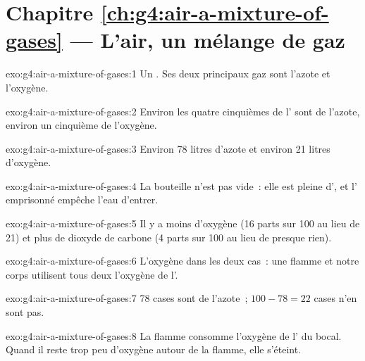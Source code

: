 \section*{Chapitre \ref{ch:g4:air-a-mixture-of-gases} --- L'air, un mélange de gaz}

\begin{solution}{exo:g4:air-a-mixture-of-gases:1}
Un . Ses deux principaux gaz sont l'azote et l'oxygène.
\end{solution}

\begin{solution}{exo:g4:air-a-mixture-of-gases:2}
Environ les quatre cinquièmes de l' sont de l'azote, environ un
cinquième de l'oxygène.
\end{solution}

\begin{solution}{exo:g4:air-a-mixture-of-gases:3}
Environ 78 litres d'azote et environ 21 litres d'oxygène.
\end{solution}

\begin{solution}{exo:g4:air-a-mixture-of-gases:4}
La bouteille n'est pas vide~: elle est pleine d', et l' emprisonné
empêche l'eau d'entrer.
\end{solution}

\begin{solution}{exo:g4:air-a-mixture-of-gases:5}
Il y a moins d'oxygène (16 parts sur 100 au lieu de 21) et plus de
dioxyde de carbone (4 parts sur 100 au lieu de presque rien).
\end{solution}

\begin{solution}{exo:g4:air-a-mixture-of-gases:6}
L'oxygène dans les deux cas~: une flamme et notre corps utilisent tous
deux l'oxygène de l'.
\end{solution}

\begin{solution}{exo:g4:air-a-mixture-of-gases:7}
78 cases sont de l'azote~; $100 - 78 = 22$ cases n'en sont pas.
\end{solution}

\begin{solution}{exo:g4:air-a-mixture-of-gases:8}
La flamme consomme l'oxygène de l' du bocal. Quand il reste trop peu
d'oxygène autour de la flamme, elle s'éteint.
\end{solution}

